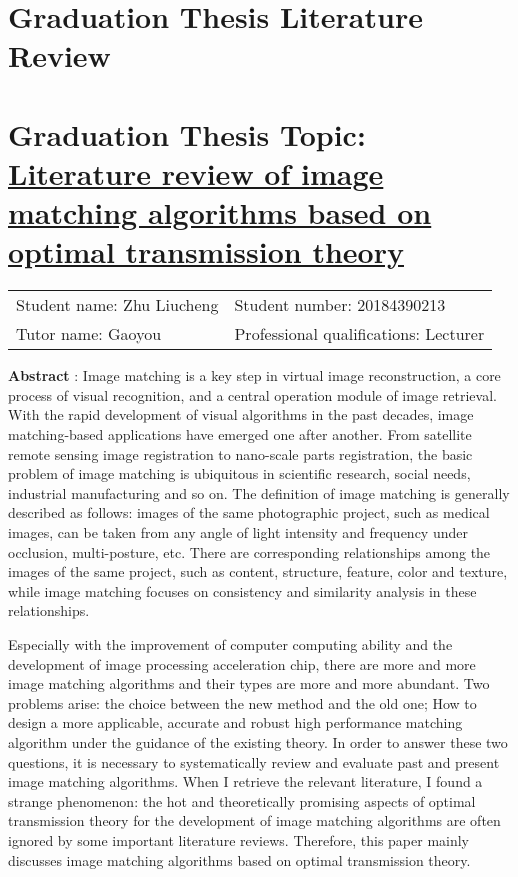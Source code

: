 
\intobmk\section*{\textbf{Graduation Thesis Literature Review}}
\vspace*{20pt}

\intobmk\section*{\textbf{Graduation Thesis Topic:}  \uline{Literature review of image matching algorithms based on optimal transmission theory}}

\begin{tabular}{ll}\centering
    Student name: Zhu Liucheng     &    Student number: 20184390213 \\
    Tutor name:   Gaoyou           &    Professional qualifications: Lecturer
\end{tabular}

\vspace*{20pt}

\noindent
\textbf{Abstract} : Image matching is a key step in virtual image reconstruction, a core process of visual recognition, and a 
central operation module of image retrieval. With the rapid development of visual algorithms in the past decades, image 
matching-based applications have emerged one after another. From satellite remote sensing image registration to nano-scale parts 
registration, the basic problem of image matching is ubiquitous in scientific research, social needs, industrial manufacturing 
and so on. The definition of image matching is generally described as follows: images of the same photographic project, such as 
medical images, can be taken from any angle of light intensity and frequency under occlusion, multi-posture, etc. There are 
corresponding relationships among the images of the same project, such as content, structure, feature, color and texture,  
while image matching focuses on consistency and similarity analysis in these relationships.

Especially with the improvement of computer computing ability and the development of image processing acceleration chip, 
there are more and more image matching algorithms and their types are more and more abundant. Two problems arise: the choice 
between the new method and the old one; How to design a more applicable, accurate and robust high performance matching algorithm 
under the guidance of the existing theory. In order to answer these two questions, it is necessary to systematically review and 
evaluate past and present image matching algorithms. When I retrieve the relevant literature, I found a strange phenomenon: 
the hot and theoretically promising aspects of optimal transmission theory for the development of image matching algorithms are 
often ignored by some important literature reviews\cite{ma2021image}. Therefore, this paper mainly discusses image matching 
algorithms based on optimal transmission theory.

